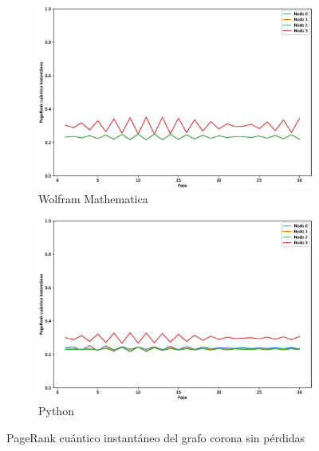 \begin{figure}[H]
    \centering
    \begin{subfigure}[m]{0.45\textwidth}
        \centering
        \includegraphics[width=0.9\linewidth]{img/crown-inst-M.eps}
        \caption{Wolfram Mathematica}
    \end{subfigure}
    \begin{subfigure}[m]{0.45\textwidth}
        \centering
        \includegraphics[width=0.9\linewidth]{img/crown-inst-lossless.eps}
        \caption{Python}
    \end{subfigure}
    \caption[PageRank cuántico instantáneo del grafo corona sin pérdidas]{PageRank cuántico instantáneo del grafo corona sin pérdidas}
    \label{fig:instcrownlossless}
\end{figure}

